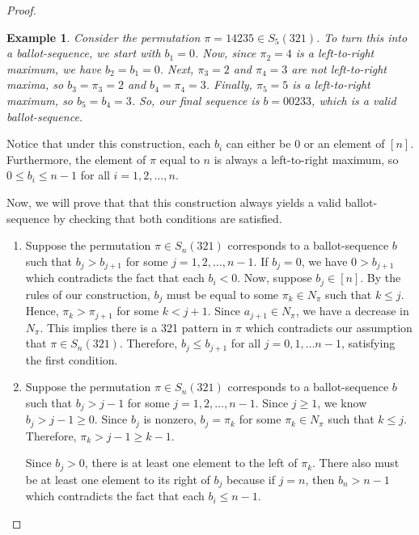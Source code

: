 \documentclass[12pt]{article}
\newtheorem{ex}{Example} %
\begin{document}
\begin{proof}
    \begin{ex}\label{PermToBallot}
        Consider the permutation $\pi=14235\in S_5(321)$. To turn this into a ballot-sequence, we start with $b_1=0$. Now, since $\pi_2=4$ is a left-to-right maximum, we have $b_2=b_1=0$. Next, $\pi_3=2$ and $\pi_4=3$ are not left-to-right maxima, so $b_3=\pi_3=2$ and $b_4=\pi_4=3$. Finally, $\pi_5=5$ is a left-to-right maximum, so $b_5=b_4=3$. So, our final sequence is $b=00233$, which is a valid ballot-sequence.
    \end{ex}
    
        
    Notice that under this construction, each $b_i$ can either be 0 or an element of $[n]$. Furthermore, the element of $\pi$ equal to $n$ is always a left-to-right maximum, so $0\leq b_i\leq n-1$ for all $i=1,2,\dots,n$.
    
    Now, we will prove that that this construction always yields a valid ballot-sequence by checking that both conditions are satisfied.
    \begin{enumerate}
        \item Suppose the permutation $\pi\in S_n(321)$ corresponds to a ballot-sequence $b$ such that $b_j>b_{j+1}$ for some $j=1,2,\dots,n-1$. If $b_j=0$, we have $0>b_{j+1}$ which contradicts the fact that each $b_i<0$. Now, suppose $b_j\in[n]$. By the rules of our construction, $b_j$ must be equal to some $\pi_k\in N_\pi$ such that $k\leq j$. Hence, $\pi_k>\pi_{j+1}$ for some $k<j+1$. Since $a_{j+1}\in N_\pi$, we have a decrease in $N_\pi$. This implies there is a 321 pattern in $\pi$ which contradicts our assumption that $\pi\in S_n(321)$. Therefore, $b_j\leq b_{j+1}$ for all $j=0,1,\dots n-1$, satisfying the first condition.

        \item Suppose the permutation $\pi\in S_n(321)$ corresponds to a ballot-sequence $b$ such that $b_j>j-1$ for some $j=1,2,\dots,n-1$. Since $j\geq1$, we know $b_j>j-1\geq0$. Since $b_j$ is nonzero, $b_j=\pi_k$ for some $\pi_k\in N_\pi$ such that $k\leq j$. Therefore, $\pi_k>j-1\geq k-1$. 
        
        Since $b_j>0$, there is at least one element to the left of $\pi_k$. There also must be at least one element to its right of $b_j$ because if $j=n$, then $b_n>n-1$ which contradicts the fact that each $b_i\leq n-1$.
        

\end{enumerate}
\end{proof}
\end{document}
